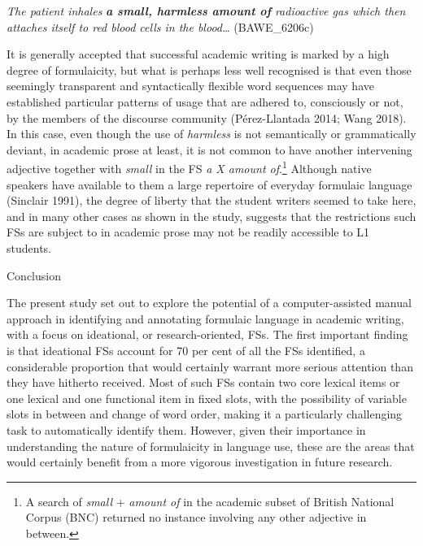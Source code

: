\setcounter{listWWNumxxvileveli}{0}
\begin{listWWNumxxvileveli}
\item 
\begin{styleListParagraph}
\textit{The patient inhales }\textbf{\textit{a small, harmless amount of}}\textit{ radioactive gas which then attaches itself to red blood cells in the blood… }(BAWE\_6206c)\textit{ }
\end{styleListParagraph}
\end{listWWNumxxvileveli}
\begin{styleStandard}
It is generally accepted that successful academic writing is marked by a high degree of formulaicity, but what is perhaps less well recognised is that even those seemingly transparent and syntactically flexible word sequences may have established particular patterns of usage that are adhered to, consciously or not, by the members of the discourse community (Pérez-Llantada 2014; Wang 2018). In this case, even though the use of \textit{harmless }is not semantically or grammatically deviant, in academic prose at least, it is not common to have another intervening adjective together with \textit{small }in the FS \textit{a X amount of}.\footnote{ \textrm{A search of }\textrm{\textit{small }}\textrm{+ }\textrm{\textit{amount of }}\textrm{in the academic subset of British National Corpus (BNC) returned no instance involving any other adjective in between.}\par } Although native speakers have available to them a large repertoire of everyday formulaic language (Sinclair 1991), the degree of liberty that the student writers seemed to take here, and in many other cases as shown in the study, suggests that the restrictions such FSs are subject to in academic prose may not be readily accessible to L1 students.
\end{styleStandard}


\setcounter{listWWNumxivleveli}{0}
\begin{listWWNumxivleveli}
\item 
\begin{stylelsSectioni}
Conclusion
\end{stylelsSectioni}
\end{listWWNumxivleveli}
\begin{styleStandard}
The present study set out to explore the potential of a computer-assisted manual approach in identifying and annotating formulaic language in academic writing, with a focus on ideational, or research-oriented, FSs. The first important finding is that ideational FSs account for 70 per cent of all the FSs identified, a considerable proportion that would certainly warrant more serious attention than they have hitherto received. Most of such FSs contain two core lexical items or one lexical and one functional item in fixed slots, with the possibility of variable slots in between and change of word order, making it a particularly challenging task to automatically identify them. However, given their importance in understanding the nature of formulaicity in language use, these are the areas that would certainly benefit from a more vigorous investigation in future research.
\end{styleStandard}

